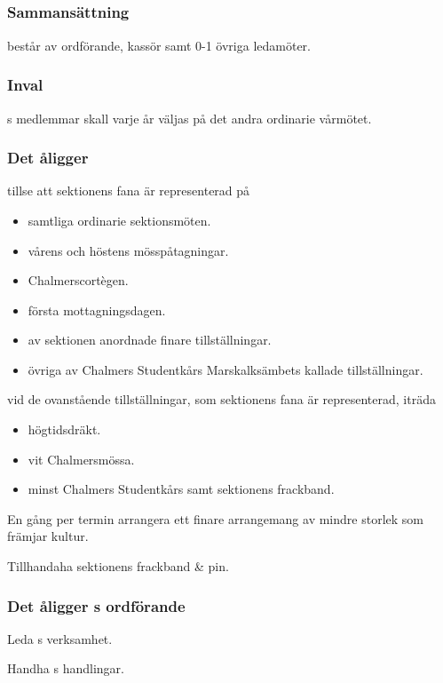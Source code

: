 \subsection{\FANBARERITFULL}
\subsubsection{Sammansättning}
\FANBARERIT{} består av ordförande, kassör samt 0-1 övriga ledamöter.

\subsubsection{Inval}
\FANBARERIT{}s medlemmar skall varje år väljas på det andra ordinarie vårmötet.

\subsubsection{Det åligger \FANBARERIT}
\label{sec:fanbarerit:function}
\begin{att}
	\item tillse att sektionens fana är representerad på
	\begin{itemize}
		\item samtliga ordinarie sektionsmöten.
		\item vårens och höstens mösspåtagningar.
		\item Chalmerscortègen.
		\item första mottagningsdagen.
		\item av sektionen anordnade finare tillställningar.
		\item övriga av Chalmers Studentkårs Marskalksämbets kallade tillställningar.
	\end{itemize}
	\item vid de ovanstående tillställningar, som sektionens fana är representerad, iträda
	\begin{itemize}
		\item högtidsdräkt.
		\item vit Chalmersmössa.
		\item minst Chalmers Studentkårs samt sektionens frackband.
	\end{itemize}
	\item En gång per termin arrangera ett finare arrangemang av mindre storlek som främjar kultur.
	\item Tillhandaha sektionens frackband \& pin.
\end{att}

\subsubsection{Det åligger \FANBARERIT{}s ordförande}
\begin{att}
	\item Leda \FANBARERIT{}s verksamhet.
	\item Handha \FANBARERIT{}s handlingar.
\end{att}

